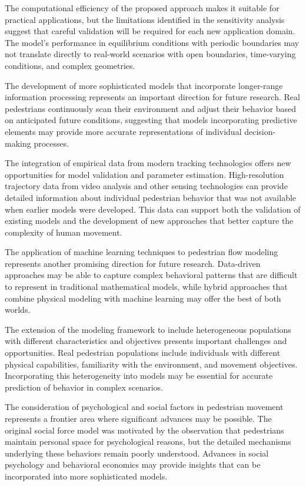 \documentclass[12pt,a4paper]{article}
\begin{document}
The computational efficiency of the proposed approach makes it suitable for practical applications, but the limitations identified in the sensitivity analysis suggest that careful validation will be required for each new application domain. The model's performance in equilibrium conditions with periodic boundaries may not translate directly to real-world scenarios with open boundaries, time-varying conditions, and complex geometries.

The development of more sophisticated models that incorporate longer-range information processing represents an important direction for future research. Real pedestrians continuously scan their environment and adjust their behavior based on anticipated future conditions, suggesting that models incorporating predictive elements may provide more accurate representations of individual decision-making processes.

The integration of empirical data from modern tracking technologies offers new opportunities for model validation and parameter estimation. High-resolution trajectory data from video analysis and other sensing technologies can provide detailed information about individual pedestrian behavior that was not available when earlier models were developed. This data can support both the validation of existing models and the development of new approaches that better capture the complexity of human movement.

The application of machine learning techniques to pedestrian flow modeling represents another promising direction for future research. Data-driven approaches may be able to capture complex behavioral patterns that are difficult to represent in traditional mathematical models, while hybrid approaches that combine physical modeling with machine learning may offer the best of both worlds.

The extension of the modeling framework to include heterogeneous populations with different characteristics and objectives presents important challenges and opportunities. Real pedestrian populations include individuals with different physical capabilities, familiarity with the environment, and movement objectives. Incorporating this heterogeneity into models may be essential for accurate prediction of behavior in complex scenarios.

The consideration of psychological and social factors in pedestrian movement represents a frontier area where significant advances may be possible. The original social force model was motivated by the observation that pedestrians maintain personal space for psychological reasons, but the detailed mechanisms underlying these behaviors remain poorly understood. Advances in social psychology and behavioral economics may provide insights that can be incorporated into more sophisticated models.
\end{document}
